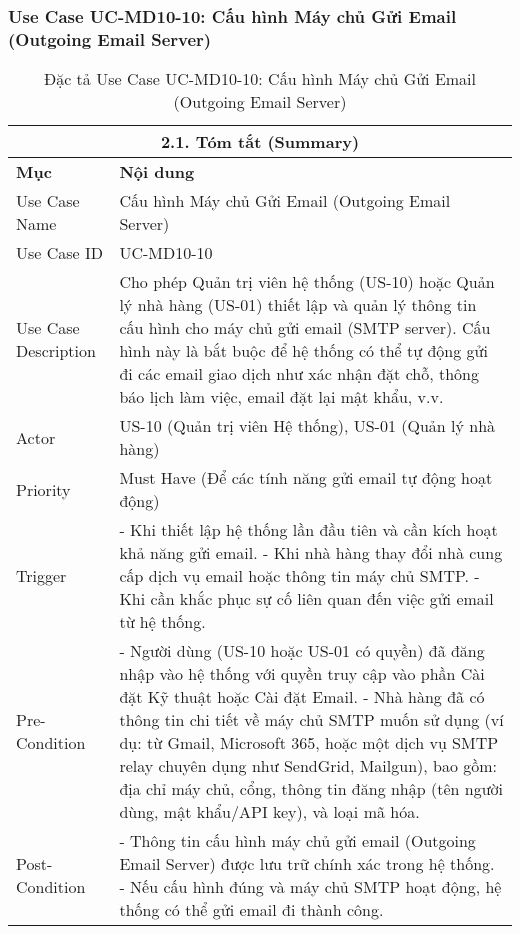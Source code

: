 \subsubsection{Use Case UC-MD10-10: Cấu hình Máy chủ Gửi Email (Outgoing Email Server)}
\begin{longtable}{|m{4cm}|p{11cm}|}
\caption{Đặc tả Use Case UC-MD10-10: Cấu hình Máy chủ Gửi Email (Outgoing Email Server)} \label{tab:uc_md10_10_full_v2_latex_fixed_in_codeblock} \\
\hline
\multicolumn{2}{|c|}{\textbf{2.1. Tóm tắt (Summary)}} \\
\hline
\textbf{Mục} & \textbf{Nội dung} \\
\hline
\endhead %
\midrule
\endfoot %
\bottomrule
\endlastfoot %
Use Case Name & Cấu hình Máy chủ Gửi Email (Outgoing Email Server) \\
\hline
Use Case ID & UC-MD10-10 \\
\hline
Use Case Description & Cho phép Quản trị viên hệ thống (US-10) hoặc Quản lý nhà hàng (US-01) thiết lập và quản lý thông tin cấu hình cho máy chủ gửi email (SMTP server). Cấu hình này là bắt buộc để hệ thống có thể tự động gửi đi các email giao dịch như xác nhận đặt chỗ, thông báo lịch làm việc, email đặt lại mật khẩu, v.v. \\
\hline
Actor & US-10 (Quản trị viên Hệ thống), US-01 (Quản lý nhà hàng) \\
\hline
Priority & Must Have (Để các tính năng gửi email tự động hoạt động) \\
\hline
Trigger & - Khi thiết lập hệ thống lần đầu tiên và cần kích hoạt khả năng gửi email. \newline - Khi nhà hàng thay đổi nhà cung cấp dịch vụ email hoặc thông tin máy chủ SMTP. \newline - Khi cần khắc phục sự cố liên quan đến việc gửi email từ hệ thống. \\
\hline
Pre-Condition & - Người dùng (US-10 hoặc US-01 có quyền) đã đăng nhập vào hệ thống với quyền truy cập vào phần Cài đặt Kỹ thuật hoặc Cài đặt Email. \newline - Nhà hàng đã có thông tin chi tiết về máy chủ SMTP muốn sử dụng (ví dụ: từ Gmail, Microsoft 365, hoặc một dịch vụ SMTP relay chuyên dụng như SendGrid, Mailgun), bao gồm: địa chỉ máy chủ, cổng, thông tin đăng nhập (tên người dùng, mật khẩu/API key), và loại mã hóa. \\
\hline
Post-Condition & - Thông tin cấu hình máy chủ gửi email (Outgoing Email Server) được lưu trữ chính xác trong hệ thống. \newline - Nếu cấu hình đúng và máy chủ SMTP hoạt động, hệ thống có thể gửi email đi thành công. \\

\end{longtable}
